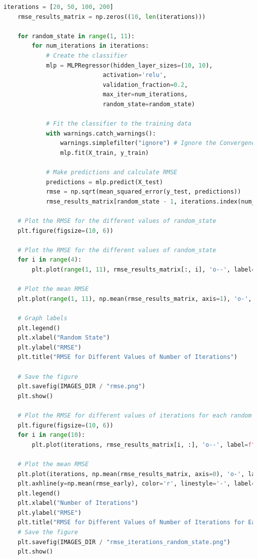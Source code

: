 \documentclass{article}
\begin{document}
\begin{lstlisting}[language=Python]
    iterations = [20, 50, 100, 200]
    rmse_results_matrix = np.zeros((10, len(iterations)))

    for random_state in range(1, 11):
        for num_iterations in iterations:
            # Create the classifier
            mlp = MLPRegressor(hidden_layer_sizes=(10, 10),
                            activation='relu',
                            validation_fraction=0.2,
                            max_iter=num_iterations,
                            random_state=random_state)
            
            # Fit the classifier to the training data
            with warnings.catch_warnings():
                warnings.simplefilter("ignore") # Ignore the ConvergenceWarning from sklearn
                mlp.fit(X_train, y_train)

            # Make predictions and calculate RMSE
            predictions = mlp.predict(X_test)
            rmse = np.sqrt(mean_squared_error(y_test, predictions))
            rmse_results_matrix[random_state - 1, iterations.index(num_iterations)] = rmse

    # Plot the RMSE for the different values of random_state
    plt.figure(figsize=(10, 6))

    # Plot the RMSE for the different values of random_state
    for i in range(4):
        plt.plot(range(1, 11), rmse_results_matrix[:, i], 'o--', label=f"{iterations[i]} Iterations", alpha=0.5)

    # Plot the mean RMSE
    plt.plot(range(1, 11), np.mean(rmse_results_matrix, axis=1), 'o-', label="Mean RMSE")

    # Graph labels
    plt.legend()
    plt.xlabel("Random State")
    plt.ylabel("RMSE")
    plt.title("RMSE for Different Values of Number of Iterations")

    # Save the figure
    plt.savefig(IMAGES_DIR / "rmse.png")
    plt.show()

    # Plot the RMSE for different values of iterations for each random state
    plt.figure(figsize=(10, 6))
    for i in range(10):
        plt.plot(iterations, rmse_results_matrix[i, :], 'o--', label=f"Random State = {i + 1}", alpha=0.5)

    # Plot the mean RMSE
    plt.plot(iterations, np.mean(rmse_results_matrix, axis=0), 'o-', label="Mean RMSE")
    plt.axhline(y=np.mean(rmse_early), color='r', linestyle='-', label="Mean RMSE Early Stopping")
    plt.legend()
    plt.xlabel("Number of Iterations")
    plt.ylabel("RMSE")
    plt.title("RMSE for Different Values of Number of Iterations for Each Random State")
    # Save the figure
    plt.savefig(IMAGES_DIR / "rmse_iterations_random_state.png")
    plt.show()

\end{lstlisting}
\end{document}
